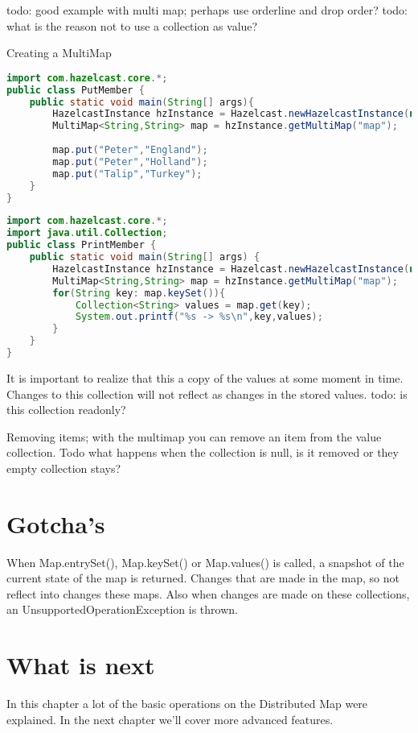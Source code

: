 todo: good example with multi map; perhaps use orderline and drop order?
todo: what is the reason not to use a collection as value?

Creating a MultiMap

\begin{lstlisting}[language=java]
import com.hazelcast.core.*;
public class PutMember {
    public static void main(String[] args){
        HazelcastInstance hzInstance = Hazelcast.newHazelcastInstance(null);
        MultiMap<String,String> map = hzInstance.getMultiMap("map");
        
        map.put("Peter","England");
        map.put("Peter","Holland");
        map.put("Talip","Turkey");
    }
}
\end{lstlisting}

\begin{lstlisting}[language=java]
import com.hazelcast.core.*;
import java.util.Collection;
public class PrintMember {
    public static void main(String[] args) {
        HazelcastInstance hzInstance = Hazelcast.newHazelcastInstance(null);
        MultiMap<String,String> map = hzInstance.getMultiMap("map");
        for(String key: map.keySet()){
            Collection<String> values = map.get(key);
            System.out.printf("%s -> %s\n",key,values);
        }
    }
}
\end{lstlisting}

It is important to realize that this a copy of the values at some moment in time. Changes to this collection will not reflect as changes in the stored values. todo: is this collection readonly?

Removing items;
with the multimap you can remove an item from the value collection. Todo what happens when the collection is null, is it removed or they empty collection stays?

\section{Gotcha's}

When Map.entrySet(), Map.keySet() or Map.values() is called, a snapshot of the current state of the map is returned. Changes that are made in the map, so not reflect into changes these maps. Also when changes are made on these collections, an UnsupportedOperationException is thrown.

\section{What is next}
In this chapter a lot of the basic operations on the Distributed Map were explained. In the next chapter we'll cover more advanced features.








